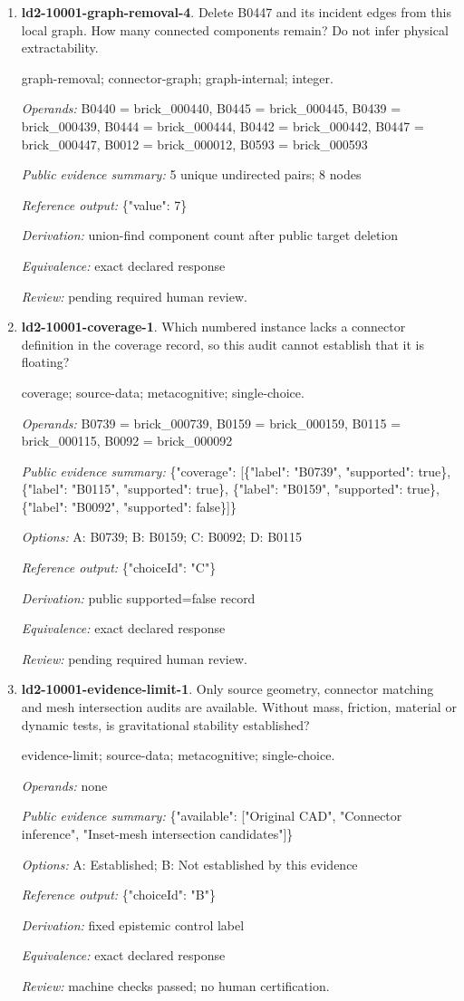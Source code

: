 \begin{enumerate}
\item \textbf{ld2-10001-graph-removal-4}. Delete B0447 and its incident edges from this local graph. How many connected components remain? Do not infer physical extractability.
\par{\small graph-removal; connector-graph; graph-internal; integer.\par\textit{Operands:} B0440 = brick\_000440, B0445 = brick\_000445, B0439 = brick\_000439, B0444 = brick\_000444, B0442 = brick\_000442, B0447 = brick\_000447, B0012 = brick\_000012, B0593 = brick\_000593\par\textit{Public evidence summary:} 5 unique undirected pairs; 8 nodes\par\textit{Reference output:} \{"value": 7\}\par\textit{Derivation:} union-find component count after public target deletion\par\textit{Equivalence:} exact declared response\par\textit{Review:} pending required human review.}
\item \textbf{ld2-10001-coverage-1}. Which numbered instance lacks a connector definition in the coverage record, so this audit cannot establish that it is floating?
\par{\small coverage; source-data; metacognitive; single-choice.\par\textit{Operands:} B0739 = brick\_000739, B0159 = brick\_000159, B0115 = brick\_000115, B0092 = brick\_000092\par\textit{Public evidence summary:} \{"coverage": [\{"label": "B0739", "supported": true\}, \{"label": "B0115", "supported": true\}, \{"label": "B0159", "supported": true\}, \{"label": "B0092", "supported": false\}]\}\par\textit{Options:} A: B0739; B: B0159; C: B0092; D: B0115\par\textit{Reference output:} \{"choiceId": "C"\}\par\textit{Derivation:} public supported=false record\par\textit{Equivalence:} exact declared response\par\textit{Review:} pending required human review.}
\item \textbf{ld2-10001-evidence-limit-1}. Only source geometry, connector matching and mesh intersection audits are available. Without mass, friction, material or dynamic tests, is gravitational stability established?
\par{\small evidence-limit; source-data; metacognitive; single-choice.\par\textit{Operands:} none\par\textit{Public evidence summary:} \{"available": ["Original CAD", "Connector inference", "Inset-mesh intersection candidates"]\}\par\textit{Options:} A: Established; B: Not established by this evidence\par\textit{Reference output:} \{"choiceId": "B"\}\par\textit{Derivation:} fixed epistemic control label\par\textit{Equivalence:} exact declared response\par\textit{Review:} machine checks passed; no human certification.}

\end{enumerate}
